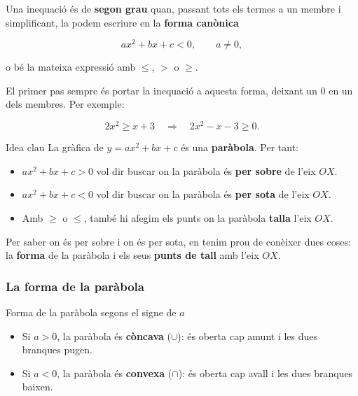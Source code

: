 Una inequació és de \textbf{segon grau} quan, passant tots els termes a un membre i simplificant, la podem escriure en la \textbf{forma canònica}

\[
ax^2+bx+c<0, \qquad a\neq 0,
\]

o bé la mateixa expressió amb $\leq$, $>$ o $\geq$.

El primer pas sempre és portar la inequació a aquesta forma, deixant un $0$ en un dels membres. Per exemple:

\[
2x^2\geq x+3 \quad\Rightarrow\quad 2x^2-x-3\geq 0.
\]

\begin{definicio}{Idea clau}
La gràfica de $y=ax^2+bx+c$ és una \textbf{paràbola}. Per tant:

\begin{itemize}
\item $ax^2+bx+c>0$ vol dir buscar on la paràbola és \textbf{per sobre} de l'eix $OX$.
\item $ax^2+bx+c<0$ vol dir buscar on la paràbola és \textbf{per sota} de l'eix $OX$.
\item Amb $\geq$ o $\leq$, també hi afegim els punts on la paràbola \textbf{talla} l'eix $OX$.
\end{itemize}
\end{definicio}

Per saber on és per sobre i on és per sota, en tenim prou de conèixer dues coses: la \textbf{forma} de la paràbola i els seus \textbf{punts de tall} amb l'eix $OX$.

\subsubsection{La forma de la paràbola}

\begin{definicio}{Forma de la paràbola segons el signe de $a$}
\begin{itemize}
\item Si $a>0$, la paràbola és \textbf{còncava} ($\cup$): és oberta cap amunt i les dues branques pugen.
\item Si $a<0$, la paràbola és \textbf{convexa} ($\cap$): és oberta cap avall i les dues branques baixen.
\end{itemize}
\end{definicio}

